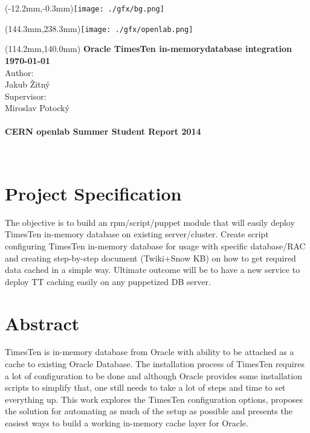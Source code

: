 \documentclass[11pt, letterpaper]{article}
\begin{document}
\begin{textblock*}{0mm}(-12.2mm,-0.3mm)\noindent \texttt{[image: ./gfx/bg.png]}\end{textblock*}
\begin{textblock*}{0mm}(144.3mm,238.3mm)\noindent \texttt{[image: ./gfx/openlab.png]}\end{textblock*}
\begin{textblock*}{150mm}(114.2mm,140.0mm)\noindent
{\bfseries\sffamily\textbf{\fontsize{20}{20}\selectfont\color{natc}Oracle TimesTen in-memory\newline database integration}}\\[36pt]
{\bfseries\sffamily\textbf{\fontsize{16}{20}\selectfont\color{natc}\motd\today}}\\[18pt]
{\sffamily\fontsize{14}{20}\selectfont\color{subc}Author:}\\
{\sffamily\fontsize{14}{20}\selectfont\color{subc}Jakub Žitný}\\[18pt]
{\sffamily\fontsize{14}{20}\selectfont\color{subc}Supervisor:}\\
{\sffamily\fontsize{14}{20}\selectfont\color{subc}Miroslav Potocký}\\
{\sffamily\fontsize{14}{20}\selectfont\color{subc}}\\[18pt]
\textbf{\bfseries\sffamily\fontsize{11}{20}\selectfont\color{subc}CERN openlab Summer Student Report 2014}

\end{textblock*}
~
\thispagestyle{empty}\newpage


\section*{Project Specification}
The objective is to build an rpm/script/puppet module that will easily deploy TimesTen in-memory database on existing server/cluster. Create script configuring TimesTen in-memory database for usage with specific database/RAC and creating step-by-step document (Twiki+Snow KB) on how to get required data cached in a simple way. Ultimate outcome will be to have a new service to deploy TT caching easily on any puppetized DB server.
\newpage


\section*{Abstract}
TimesTen is in-memory database from Oracle with ability to be attached as a cache to existing Oracle Database. The installation process of TimesTen requires a lot of configuration to be done and although Oracle provides some installation scripts to simplify that, one still needs to take a lot of steps and time to set everything up. This work explores the TimesTen configuration options, proposes the solution for automating as much of the setup as possible and presents the easiest ways to build a working in-memory cache layer for Oracle.
\newpage
\end{document}
